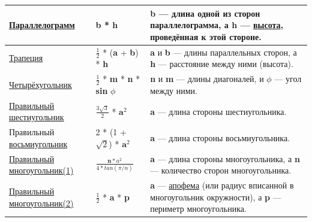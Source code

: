 \documentclass[a4paper,8pt,leqno]{article}
\theoremstyle{plain}
\theoremstyle{definition} %
\theoremstyle{remark} %
\begin{document}
\begin{table}[]
\begin{tabular}{|p{4cm}|p{7cm}|p{4cm}|}
	\href{https://ru.wikipedia.org/wiki/\%D0\%9F\%D0\%B0\%D1\%80\%D0\%B0\%D0\%BB\%D0\%BB\%D0\%B5\%D0\%BB\%D0\%BE\%D0\%B3\%D1\%80\%D0\%B0\%D0\%BC\%D0\%BC}{Параллелограмм}	& \textbf{b} * \textbf{h} & \textbf{b} — длина одной из сторон параллелограмма, а \textbf{h} — \href{https://ru.wikipedia.org/wiki/\%D0\%92\%D1\%8B\%D1\%81\%D0\%BE\%D1\%82\%D0\%B0\_(\%D0\%B3\%D0\%B5\%D0\%BE\%D0\%BC\%D0\%B5\%D1\%82\%D1\%80\%D0\%B8\%D1\%8F)}{высота}, проведённая к этой стороне.      \\ \hline
	\href{https://ru.wikipedia.org/wiki/\%D0\%A2\%D1\%80\%D0\%B0\%D0\%BF\%D0\%B5\%D1\%86\%D0\%B8\%D1\%8F}{Трапеция}	& $\frac{1}{2}$ * (\textbf{a} + \textbf{b}) * \textbf{h}         & \textbf{a} и \textbf{b} — длины параллельных сторон, а \textbf{h} — расстояние между ними (высота).            \\ \hline
	\href{https://ru.wikipedia.org/wiki/\%D0\%A7\%D0\%B5\%D1\%82\%D1\%8B\%D1\%80\%D1\%91\%D1\%85\%D1\%83\%D0\%B3\%D0\%BE\%D0\%BB\%D1\%8C\%D0\%BD\%D0\%B8\%D0\%BA}{Четырёхугольник}	& $\frac{1}{2}$ * \textbf{m} * \textbf{n} * \textbf{sin} $\phi$ & \textbf{n} и \textbf{m} — длины диагоналей, и $\phi$  — угол между ними.             \\ \hline
	\href{https://ru.wikipedia.org/wiki/\%D0\%9F\%D1\%80\%D0\%B0\%D0\%B2\%D0\%B8\%D0\%BB\%D1\%8C\%D0\%BD\%D1\%8B\%D0\%B9\_\%D1\%88\%D0\%B5\%D1\%81\%D1\%82\%D0\%B8\%D1\%83\%D0\%B3\%D0\%BE\%D0\%BB\%D1\%8C\%D0\%BD\%D0\%B8\%D0\%BA}{Правильный шестиугольник} & $\frac{3\sqrt{3}}{2}$ * $\textbf{a}^2$         & \textbf{a} — длина стороны шестиугольника.            \\ \hline
	Правильный \href{https://ru.wikipedia.org/wiki/\%D0\%92\%D0\%BE\%D1\%81\%D1\%8C\%D0\%BC\%D0\%B8\%D1\%83\%D0\%B3\%D0\%BE\%D0\%BB\%D1\%8C\%D0\%BD\%D0\%B8\%D0\%BA}{восьмиугольник}	& 2 * (1 + $\sqrt{2}$) * $\textbf{a}^2$ & \textbf{a} — длина стороны восьмиугольника.            \\ \hline
	\href{https://ru.wikipedia.org/wiki/\%D0\%9F\%D1\%80\%D0\%B0\%D0\%B2\%D0\%B8\%D0\%BB\%D1\%8C\%D0\%BD\%D1\%8B\%D0\%B9\_\%D0\%BC\%D0\%BD\%D0\%BE\%D0\%B3\%D0\%BE\%D1\%83\%D0\%B3\%D0\%BE\%D0\%BB\%D1\%8C\%D0\%BD\%D0\%B8\%D0\%BA}{Правильный многоугольник(1)}	& $\frac{\textbf{n} * a^2}{4 * tan (\pi/n)}$ & \textbf{a} — длина стороны многоугольника, а \textbf{n} — количество сторон многоугольника.           \\ \hline
	\href{https://ru.wikipedia.org/wiki/\%D0\%9F\%D1\%80\%D0\%B0\%D0\%B2\%D0\%B8\%D0\%BB\%D1\%8C\%D0\%BD\%D1\%8B\%D0\%B9\_\%D0\%BC\%D0\%BD\%D0\%BE\%D0\%B3\%D0\%BE\%D1\%83\%D0\%B3\%D0\%BE\%D0\%BB\%D1\%8C\%D0\%BD\%D0\%B8\%D0\%BA}{Правильный многоугольник(2)}	& $\frac{1}{2}$ * \textbf{a} * \textbf{p}       & \textbf{a} — \href{https://ru.wikipedia.org/wiki/\%D0\%90\%D0\%BF\%D0\%BE\%D1\%84\%D0\%B5\%D0\%BC\%D0\%B0}{апофема} (или радиус вписанной в многоугольник окружности), а \textbf{p} — периметр многоугольника.    \\ \hline

\end{tabular}
\end{table}
\end{document}
